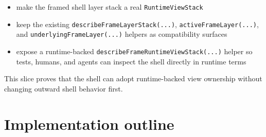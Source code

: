 \begin{itemize}
\tightlist
\item
  make the framed shell layer stack a real \texttt{R\allowbreak{}u\allowbreak{}n\allowbreak{}t\allowbreak{}i\allowbreak{}m\allowbreak{}e\allowbreak{}V\allowbreak{}i\allowbreak{}e\allowbreak{}w\allowbreak{}S\allowbreak{}t\allowbreak{}a\allowbreak{}c\allowbreak{}k}
\item
  keep the existing \texttt{d\allowbreak{}e\allowbreak{}s\allowbreak{}c\allowbreak{}r\allowbreak{}i\allowbreak{}b\allowbreak{}e\allowbreak{}F\allowbreak{}r\allowbreak{}a\allowbreak{}m\allowbreak{}e\allowbreak{}L\allowbreak{}a\allowbreak{}y\allowbreak{}e\allowbreak{}r\allowbreak{}S\allowbreak{}t\allowbreak{}a\allowbreak{}c\allowbreak{}k\allowbreak{}(\allowbreak{}.\allowbreak{}.\allowbreak{}.\allowbreak{})}, \texttt{a\allowbreak{}c\allowbreak{}t\allowbreak{}i\allowbreak{}v\allowbreak{}e\allowbreak{}F\allowbreak{}r\allowbreak{}a\allowbreak{}m\allowbreak{}e\allowbreak{}L\allowbreak{}a\allowbreak{}y\allowbreak{}e\allowbreak{}r\allowbreak{}(\allowbreak{}.\allowbreak{}.\allowbreak{}.\allowbreak{})}, and \texttt{u\allowbreak{}n\allowbreak{}d\allowbreak{}e\allowbreak{}r\allowbreak{}l\allowbreak{}y\allowbreak{}i\allowbreak{}n\allowbreak{}g\allowbreak{}F\allowbreak{}r\allowbreak{}a\allowbreak{}m\allowbreak{}e\allowbreak{}L\allowbreak{}a\allowbreak{}y\allowbreak{}e\allowbreak{}r\allowbreak{}(\allowbreak{}.\allowbreak{}.\allowbreak{}.\allowbreak{})} helpers as compatibility surfaces
\item
  expose a runtime-backed \texttt{d\allowbreak{}e\allowbreak{}s\allowbreak{}c\allowbreak{}r\allowbreak{}i\allowbreak{}b\allowbreak{}e\allowbreak{}F\allowbreak{}r\allowbreak{}a\allowbreak{}m\allowbreak{}e\allowbreak{}R\allowbreak{}u\allowbreak{}n\allowbreak{}t\allowbreak{}i\allowbreak{}m\allowbreak{}e\allowbreak{}V\allowbreak{}i\allowbreak{}e\allowbreak{}w\allowbreak{}S\allowbreak{}t\allowbreak{}a\allowbreak{}c\allowbreak{}k\allowbreak{}(\allowbreak{}.\allowbreak{}.\allowbreak{}.\allowbreak{})} helper so tests, humans, and agents can inspect the shell directly in runtime terms
\end{itemize}

This slice proves that the shell can adopt runtime-backed view ownership without changing outward shell behavior first.

\section{Implementation outline}\label{record-155-implementation-outline}

